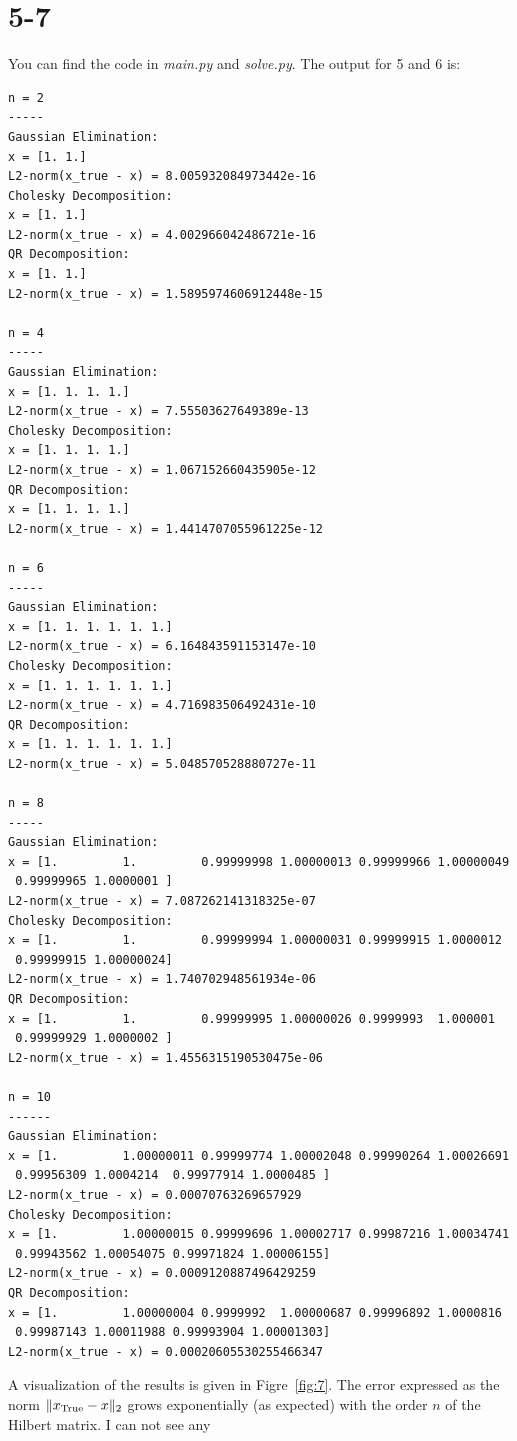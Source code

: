\documentclass[a4paper, 11pt]{article}
\begin{document}
\section*{5-7}
You can find the code in \textit{main.py} and \textit{solve.py}. The output for 5 and 6 is:
\begin{verbatim}
n = 2
-----
Gaussian Elimination:
x = [1. 1.]
L2-norm(x_true - x) = 8.005932084973442e-16
Cholesky Decomposition:
x = [1. 1.]
L2-norm(x_true - x) = 4.002966042486721e-16
QR Decomposition:
x = [1. 1.]
L2-norm(x_true - x) = 1.5895974606912448e-15

n = 4
-----
Gaussian Elimination:
x = [1. 1. 1. 1.]
L2-norm(x_true - x) = 7.55503627649389e-13
Cholesky Decomposition:
x = [1. 1. 1. 1.]
L2-norm(x_true - x) = 1.067152660435905e-12
QR Decomposition:
x = [1. 1. 1. 1.]
L2-norm(x_true - x) = 1.4414707055961225e-12

n = 6
-----
Gaussian Elimination:
x = [1. 1. 1. 1. 1. 1.]
L2-norm(x_true - x) = 6.164843591153147e-10
Cholesky Decomposition:
x = [1. 1. 1. 1. 1. 1.]
L2-norm(x_true - x) = 4.716983506492431e-10
QR Decomposition:
x = [1. 1. 1. 1. 1. 1.]
L2-norm(x_true - x) = 5.048570528880727e-11

n = 8
-----
Gaussian Elimination:
x = [1.         1.         0.99999998 1.00000013 0.99999966 1.00000049
 0.99999965 1.0000001 ]
L2-norm(x_true - x) = 7.087262141318325e-07
Cholesky Decomposition:
x = [1.         1.         0.99999994 1.00000031 0.99999915 1.0000012
 0.99999915 1.00000024]
L2-norm(x_true - x) = 1.740702948561934e-06
QR Decomposition:
x = [1.         1.         0.99999995 1.00000026 0.9999993  1.000001
 0.99999929 1.0000002 ]
L2-norm(x_true - x) = 1.4556315190530475e-06

n = 10
------
Gaussian Elimination:
x = [1.         1.00000011 0.99999774 1.00002048 0.99990264 1.00026691
 0.99956309 1.0004214  0.99977914 1.0000485 ]
L2-norm(x_true - x) = 0.00070763269657929
Cholesky Decomposition:
x = [1.         1.00000015 0.99999696 1.00002717 0.99987216 1.00034741
 0.99943562 1.00054075 0.99971824 1.00006155]
L2-norm(x_true - x) = 0.0009120887496429259
QR Decomposition:
x = [1.         1.00000004 0.9999992  1.00000687 0.99996892 1.0000816
 0.99987143 1.00011988 0.99993904 1.00001303]
L2-norm(x_true - x) = 0.00020605530255466347
\end{verbatim}
A visualization of the results is given in Figre~\ref{fig:7}. The error
expressed as the norm $\Vert x_\textup{True} - x \Vert_2$ grows exponentially
(as expected) with the order $n$ of the Hilbert matrix. I can not see any
\end{document}
